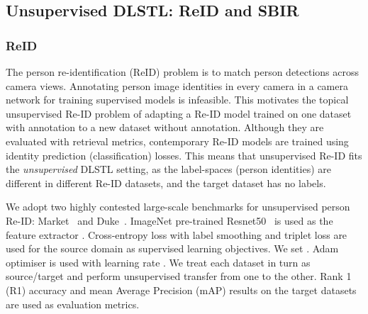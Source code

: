 \documentclass[letterpaper]{article} \usepackage{aaai19}  \usepackage{times}  \usepackage{helvet}  \usepackage{courier}  \usepackage{url}  \usepackage{graphicx}
\begin{document}
\subsection{Unsupervised DLSTL: ReID and SBIR}
\subsubsection{ReID}
The person re-identification (ReID) problem is to match person detections across camera views. Annotating person image identities in every camera in a camera network for training supervised models is infeasible. This motivates the topical unsupervised  Re-ID problem of adapting a  Re-ID model trained on one dataset with annotation to a new dataset without annotation. Although they are evaluated with retrieval metrics, contemporary Re-ID models are trained using identity prediction (classification) losses. This means that unsupervised Re-ID fits the \emph{unsupervised} DLSTL setting, as the label-spaces (person identities) are different in different Re-ID datasets, and the target dataset has no labels.

We adopt two highly contested large-scale benchmarks for unsupervised person Re-ID: Market~\cite{zheng2015scalable} and Duke~\cite{zheng2017unlabeled}. ImageNet pre-trained Resnet50~\cite{resnet} is used as the feature extractor . Cross-entropy loss with label smoothing and triplet loss are used for the source domain as supervised learning objectives. We set . Adam optimiser is used with learning rate . We treat each dataset in turn as source/target and perform unsupervised transfer from one to the other. 
 Rank 1 (R1) accuracy and mean Average Precision (mAP) results on the target datasets are used as evaluation metrics. 
 
\end{document}
